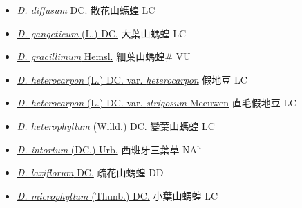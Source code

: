 \begin{itemize}
  \begin{itemize}
        \item[] \href{http://www.theplantlist.org/tpl1.1/search?q=Desmodium+diffusum}{\textit{D. diffusum} DC.}   散花山螞蝗 LC
        \item[] \href{http://www.theplantlist.org/tpl1.1/search?q=Desmodium+gangeticum}{\textit{D. gangeticum} (L.) DC.}   大葉山螞蝗 LC
        \item[] \href{http://www.theplantlist.org/tpl1.1/search?q=Desmodium+gracillimum}{\textit{D. gracillimum} Hemsl.}   細葉山螞蝗\# VU
        \item[] \href{http://www.theplantlist.org/tpl1.1/search?q=Desmodium+heterocarpon+var.+heterocarpon}{\textit{D. heterocarpon} (L.) DC. var. \textit{heterocarpon}}   假地豆 LC
        \item[] \href{http://www.theplantlist.org/tpl1.1/search?q=Desmodium+heterocarpon+var.+strigosum}{\textit{D. heterocarpon} (L.) DC. var. \textit{strigosum} Meeuwen}   直毛假地豆 LC
        \item[] \href{http://www.theplantlist.org/tpl1.1/search?q=Desmodium+heterophyllum}{\textit{D. heterophyllum} (Willd.) DC.}   變葉山螞蝗 LC
        \item[] \href{http://www.theplantlist.org/tpl1.1/search?q=Desmodium+intortum}{\textit{D. intortum} (DC.) Urb.}   西班牙三葉草 NA$^n$
        \item[] \href{http://www.theplantlist.org/tpl1.1/search?q=Desmodium+laxiflorum}{\textit{D. laxiflorum} DC.}   疏花山螞蝗 DD
        \item[] \href{http://www.theplantlist.org/tpl1.1/search?q=Desmodium+microphyllum}{\textit{D. microphyllum} (Thunb.) DC.}   小葉山螞蝗 LC

\end{itemize}
\end{itemize}

